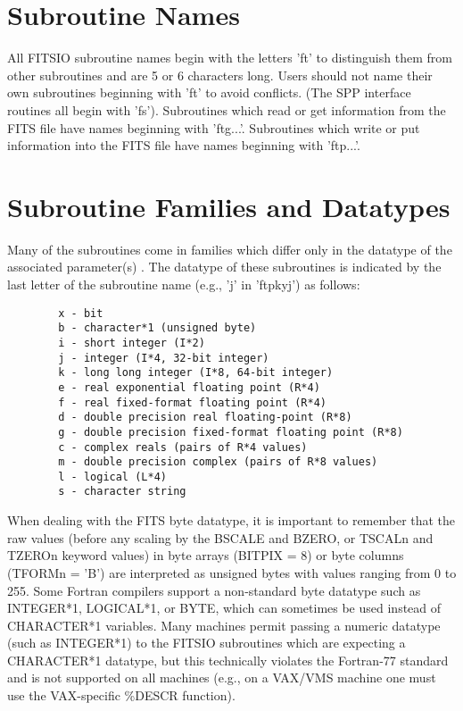 \documentclass[11pt]{book}
\begin{document}
\section{Subroutine Names}

All FITSIO subroutine names begin with the letters 'ft' to distinguish
them from other subroutines and are 5 or 6 characters long. Users should
not name their own subroutines beginning with 'ft' to avoid conflicts.
(The SPP interface routines all begin with 'fs'). Subroutines which read
or get information from the FITS file have names beginning with
'ftg...'. Subroutines which write or put information into the FITS file
have names beginning with 'ftp...'.


\section{Subroutine Families and Datatypes}

Many of the subroutines come in families which differ only in the
datatype of the associated parameter(s) .  The datatype of these
subroutines is indicated by the last letter of the subroutine name
(e.g., 'j' in 'ftpkyj') as follows:

\begin{verbatim}
        x - bit
        b - character*1 (unsigned byte)
        i - short integer (I*2)
        j - integer (I*4, 32-bit integer)
        k - long long integer (I*8, 64-bit integer)
        e - real exponential floating point (R*4)
        f - real fixed-format floating point (R*4)
        d - double precision real floating-point (R*8)
        g - double precision fixed-format floating point (R*8)
        c - complex reals (pairs of R*4 values)
        m - double precision complex (pairs of R*8 values)
        l - logical (L*4)
        s - character string
\end{verbatim}

When dealing with the FITS byte datatype, it is important to remember
that the raw values (before any scaling by the BSCALE and BZERO, or
TSCALn and TZEROn keyword values) in byte arrays (BITPIX = 8) or byte
columns (TFORMn = 'B') are interpreted as unsigned bytes with values
ranging from 0 to 255. Some Fortran compilers support a non-standard
byte datatype such as INTEGER*1, LOGICAL*1, or BYTE, which can sometimes
be used instead of CHARACTER*1 variables. Many machines permit passing a
numeric datatype (such as INTEGER*1) to the FITSIO subroutines which are
expecting a CHARACTER*1 datatype, but this technically violates the
Fortran-77 standard and is not supported on all machines (e.g., on a VAX/VMS
machine one must use the VAX-specific \%DESCR function).
\end{document}

